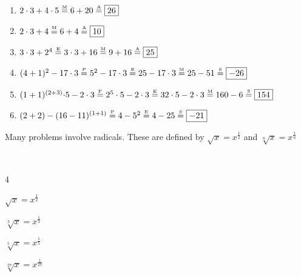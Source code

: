 \documentclass[crop=false,class=article,oneside]{standalone}
\begin{document}
        \begin{example}
            \
            \begin{enumerate}
                \item ${2}\cdot{3}+{4}\cdot{5}%
                       \overset{\textrm{\tiny{M}}}{=}%
                       6+20\overset{\textrm{\tiny{A}}}{=}%
                       \boxed{26}$
                \item ${2}\cdot{3}%
                       +4\overset{\textrm{\tiny{M}}}{=}%
                       6+4\overset{\textrm{\tiny{A}}}{=}%
                       \boxed{10}$
                \item ${3}\cdot{3+2^{4}}%
                       \overset{\textrm{\tiny{E}}}{=}%
                       {3}\cdot {3}+16%
                       \overset{\textrm{\tiny{M}}}{=}%
                       9+16\overset{\textrm{\tiny{A}}}{=}%
                       \boxed{25}$
                \item $(4+1)^2-17\cdot 3%
                    \overset{\textrm{\tiny{P}}}{=}%
                    5^{2}-17\cdot 3%
                    \overset{\textrm{\tiny{E}}}{=}25-17\cdot 3%
                    \overset{\textrm{\tiny{M}}}{=}25-51%
                    \overset{\textrm{\tiny{S}}}{=}\boxed{-26}$
                \item ${(1+1)^{(2+3)}\cdot}{5}-%
                       {2}\cdot{3}
                       \overset{\textrm{\tiny{P}}}{=}%
                       {2^{5}}\cdot{5}-{2}\cdot{3}%
                       \overset{\textrm{\tiny{E}}}{=}%
                       {32}\cdot{5}-{2}\cdot{3}%
                       \overset{\textrm{\tiny{M}}}{=}%
                       160-6\overset{\textrm{\tiny{S}}}{=}%
                       \boxed{154}$
                \item $(2+2)-(16-11)^{(1+1)}%
                       \overset{\textrm{\tiny{P}}}{=}4-5^{2}%
                       \overset{\textrm{\tiny{E}}}{=}4-25%
                       \overset{\textrm{\tiny{S}}}{=}%
                       \boxed{-21}$
            \end{enumerate}
        \end{example}
        \begin{remark}
            \label{remark:North_Shore_Radicals_Def}
            Many problems involve radicals.
            These are defined by
            $\sqrt{x}=x^{\frac{1}{2}}$ and
            $\sqrt[n]{x}=x^{\frac{1}{n}}$
        \end{remark}
        \newpage
        \begin{example}
            \
            \begin{enumerate}
            \end{enumerate}
        \end{example}
\end{document}
